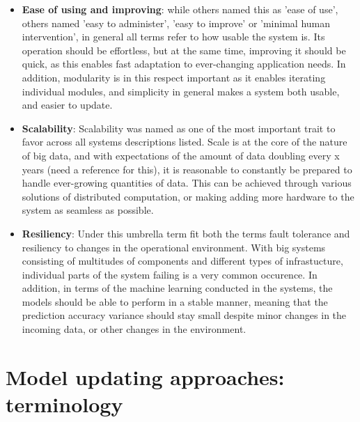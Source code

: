 \begin{itemize}
    \item \textbf{Ease of using and improving}: while others named this as 'ease of use', others named 'easy to administer', 'easy to improve' or 'minimal human intervention', in general all terms refer to how usable the system is. Its operation should be effortless, but at the same time, improving it should be quick, as this enables fast adaptation to ever-changing application needs. In addition, modularity is in this respect important as it enables iterating individual modules, and simplicity in general makes a system both usable, and easier to update.
    \item \textbf{Scalability}: Scalability was named as one of the most important trait to favor across all systems descriptions listed. Scale is at the core of the nature of big data, and with expectations of the amount of data doubling every x years (need a reference for this), it is reasonable to constantly be prepared to handle ever-growing quantities of data. This can be achieved through various solutions of distributed computation, or making adding more hardware to the system as seamless as possible.
    \item \textbf{Resiliency}: Under this umbrella term fit both the terms fault tolerance and resiliency to changes in the operational environment. With big systems consisting of multitudes of components and different types of infrastucture, individual parts of the system failing is a very common occurence. In addition, in terms of the machine learning conducted in the systems, the models should be able to perform in a stable manner, meaning that the prediction accuracy variance should stay small despite minor changes in the incoming data, or other changes in the environment.
\end{itemize}



\section{Model updating approaches: terminology}


